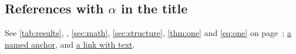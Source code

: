 \subsection{References with \texorpdfstring{$\alpha$}{alpha} in the title}
\label{sec:anchor}%
See \cref{tab:results}, , \autoref{sec:math}, \ref{sec:structure},
\cref{thm:one} and \cref{eq:one} on page~\pageref{eq:one}; \hyperref[sec:anchor]{a
named anchor}, and \href{https://example.org/docs}{a link with text}.
